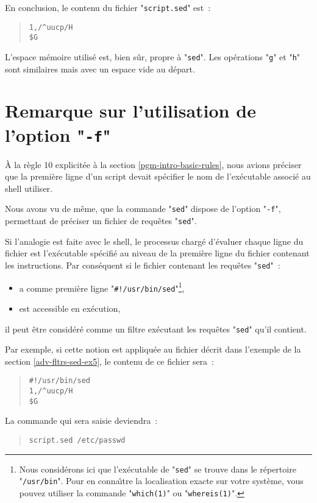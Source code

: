 En conclusion, le contenu du fichier "{\tt script.sed}" est~:
\begin{quote}
\begin{verbatim}
1,/^uucp/H
$G
\end{verbatim}
\end{quote}

\begin{remarque}
L'espace m{\'e}moire utilis{\'e} est, bien s{\^u}r, propre {\`a} "{\tt sed}". Les
op{\'e}rations "{\tt g}" et "{\tt h}" sont similaires mais avec un espace
vide au d{\'e}part.
\end{remarque}


\section{\label{adv-fltrs-sed-f}Remarque sur l'utilisation de
			l'option "{\tt -f}"}

{\`A} la r{\`e}gle 10 explicit{\'e}e {\`a} la section \ref{pgm-intro-basic-rules}, nous
avions pr{\'e}ciser que la premi{\`e}re ligne d'un script devait sp{\'e}cifier le nom
de l'ex{\'e}cutable associ{\'e} au shell utiliser.

Nous avons vu de m{\^e}me, que la commande "{\tt sed}" dispose de l'option
"{\tt -f}", permettant de pr{\'e}ciser un fichier de requ{\^e}tes "{\tt sed}".

Si l'analogie est faite avec le shell, le processus charg{\'e} d'{\'e}valuer chaque
ligne du fichier est l'ex{\'e}cutable sp{\'e}cifi{\'e} au niveau de la premi{\`e}re
ligne du fichier contenant les instructions. Par cons{\'e}quent si le fichier
contenant les requ{\^e}tes "{\tt sed}"~:
\begin{itemize}
	\item	a comme premi{\`e}re ligne "\verb=#!/usr/bin/sed="\footnote{Nous
			consid{\'e}rons ici que l'ex{\'e}cutable de "{\tt sed}" se trouve dans
			le r{\'e}pertoire "{\tt /usr/bin}". Pour en conna{\^\i}tre la
			localisation exacte sur votre syst{\`e}me, vous pouvez utiliser
			la commande "{\tt which(1)}" ou "{\tt whereis(1)}".},
	\item	est accessible en ex{\'e}cution,
\end{itemize}
il peut {\^e}tre consid{\'e}r{\'e} comme un filtre ex{\'e}cutant les requ{\^e}tes "{\tt sed}"
qu'il contient.

Par exemple, si cette notion est appliqu{\'e}e au fichier d{\'e}crit dans l'exemple
de la section \ref{adv-fltrs-sed-ex5}, le contenu de ce fichier
sera~:
\begin{quote}
\begin{verbatim}
#!/usr/bin/sed
1,/^uucp/H
$G
\end{verbatim}
\end{quote}

La commande qui sera saisie deviendra~:
\begin{quote}
\begin{verbatim}
script.sed /etc/passwd
\end{verbatim}
\end{quote}
